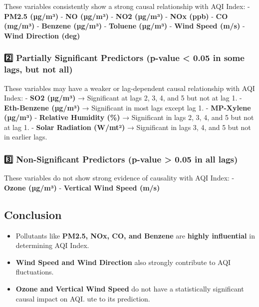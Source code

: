 \documentclass[11pt]{article}
\providecommand{\tightlist}{%
      \setlength{\itemsep}{0pt}\setlength{\parskip}{0pt}}
\begin{document}
These variables consistently show a strong causal relationship with AQI
Index: - \textbf{PM2.5 (µg/m³)} - \textbf{NO (µg/m³)} - \textbf{NO2
(µg/m³)} - \textbf{NOx (ppb)} - \textbf{CO (mg/m³)} - \textbf{Benzene
(µg/m³)} - \textbf{Toluene (µg/m³)} - \textbf{Wind Speed (m/s)} -
\textbf{Wind Direction (deg)}

\hypertarget{partially-significant-predictors-p-value-0.05-in-some-lags-but-not-all}{%
\subsubsection{\texorpdfstring{\textbf{2️⃣ Partially Significant
Predictors (p-value \textless{} 0.05 in some lags, but not
all)}}{2️⃣ Partially Significant Predictors (p-value \textless{} 0.05 in some lags, but not all)}}\label{partially-significant-predictors-p-value-0.05-in-some-lags-but-not-all}}

These variables may have a weaker or lag-dependent causal relationship
with AQI Index: - \textbf{SO2 (µg/m³)} → Significant at lags 2, 3, 4,
and 5 but not at lag 1. - \textbf{Eth-Benzene (µg/m³)} → Significant in
most lags except lag 1. - \textbf{MP-Xylene (µg/m³)} - \textbf{Relative
Humidity (\%)} → Significant in lags 2, 3, 4, and 5 but not at lag 1. -
\textbf{Solar Radiation (W/mt²)} → Significant in lags 3, 4, and 5 but
not in earlier lags.

\hypertarget{non-significant-predictors-p-value-0.05-in-all-lags}{%
\subsubsection{\texorpdfstring{\textbf{3️⃣ Non-Significant Predictors
(p-value \textgreater{} 0.05 in all
lags)}}{3️⃣ Non-Significant Predictors (p-value \textgreater{} 0.05 in all lags)}}\label{non-significant-predictors-p-value-0.05-in-all-lags}}

These variables do not show strong evidence of causality with AQI Index:
- \textbf{Ozone (µg/m³)} - \textbf{Vertical Wind Speed (m/s)}

\hypertarget{conclusion}{%
\subsection{\texorpdfstring{\textbf{Conclusion}}{Conclusion}}\label{conclusion}}

\begin{itemize}
\tightlist
\item
  Pollutants like \textbf{PM2.5, NOx, CO, and Benzene} are
  \textbf{highly influential} in determining AQI Index.
\item
  \textbf{Wind Speed and Wind Direction} also strongly contribute to AQI
  fluctuations.
\item
  \textbf{Ozone and Vertical Wind Speed} do not have a statistically
  significant causal impact on AQI. ute to its prediction.
\end{itemize}
\end{document}
